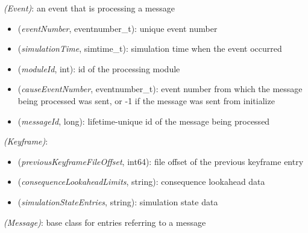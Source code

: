  \textit{(Event)}: an event that is processing a message

\begin{itemize}
  \item \tbf{\#} (\textit{eventNumber}, eventnumber\_t): unique event number
  \item {} (\textit{simulationTime}, simtime\_t): simulation time when the event occurred
  \item {} (\textit{moduleId}, int): id of the processing module
  \item {} (\textit{causeEventNumber}, eventnumber\_t): event number from which the message being processed was sent, or -1 if the message was sent from initialize
  \item {} (\textit{messageId}, long): lifetime-unique id of the message being processed
\end{itemize}

 \textit{(Keyframe)}:

\begin{itemize}
  \item {} (\textit{previousKeyframeFileOffset}, int64): file offset of the previous keyframe entry
  \item {} (\textit{consequenceLookaheadLimits}, string): consequence lookahead data
  \item {} (\textit{simulationStateEntries}, string): simulation state data
\end{itemize}

 \textit{(Message)}: base class for entries referring to a message

